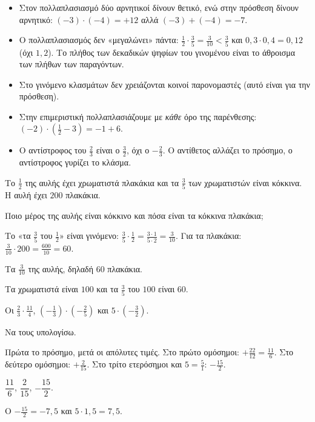 \begin{prosoxi}
\begin{itemize}[leftmargin=1.2em,itemsep=0.3ex,topsep=2pt]
\item Στον πολλαπλασιασμό δύο αρνητικοί δίνουν θετικό, ενώ στην πρόσθεση δίνουν αρνητικό: $(-3)\cdot(-4)=+12$ αλλά $(-3)+(-4)=-7$.
\item Ο πολλαπλασιασμός δεν «μεγαλώνει» πάντα: $\frac{1}{2}\cdot\frac{3}{5}=\frac{3}{10}<\frac{3}{5}$ και $0{,}3\cdot0{,}4=0{,}12$ (όχι $1{,}2$). Το πλήθος των δεκαδικών ψηφίων του γινομένου είναι το άθροισμα των πλήθων των παραγόντων.
\item Στο γινόμενο κλασμάτων δεν χρειάζονται κοινοί παρονομαστές (αυτό είναι για την πρόσθεση).
\item Στην επιμεριστική πολλαπλασιάζουμε με \emph{κάθε} όρο της παρένθεσης: $(-2)\cdot\left(\frac{1}{2}-3\right)=-1+6$.
\item Ο αντίστροφος του $\frac{2}{3}$ είναι ο $\frac{3}{2}$, όχι ο $-\frac{2}{3}$. Ο αντίθετος αλλάζει το πρόσημο, ο αντίστροφος γυρίζει το κλάσμα.
\end{itemize}
\end{prosoxi}


\tixero Το $\frac{1}{2}$ της αυλής έχει χρωματιστά πλακάκια και τα $\frac{3}{5}$ των χρωματιστών είναι κόκκινα. Η αυλή έχει $200$ πλακάκια.\par
\tithelo Ποιο μέρος της αυλής είναι κόκκινο και πόσα είναι τα κόκκινα πλακάκια;\par
\possindeo Το «τα $\frac{3}{5}$ του $\frac{1}{2}$» είναι γινόμενο: $\frac{3}{5}\cdot\frac{1}{2}=\frac{3\cdot1}{5\cdot2}=\frac{3}{10}$. Για τα πλακάκια: $\frac{3}{10}\cdot200=\frac{600}{10}=60$.\par
\apantisi Τα $\frac{3}{10}$ της αυλής, δηλαδή $60$ πλακάκια.\par
\elegxos Τα χρωματιστά είναι $100$ και τα $\frac{3}{5}$ του $100$ είναι $60$.

\tixero Οι $\frac{2}{3}\cdot\frac{11}{4}$, $\left(-\frac{1}{3}\right)\cdot\left(-\frac{2}{5}\right)$ και $5\cdot\left(-\frac{3}{2}\right)$.\par
\tithelo Να τους υπολογίσω.\par
\possindeo Πρώτα το πρόσημο, μετά οι απόλυτες τιμές. Στο πρώτο ομόσημοι: $+\frac{22}{12}=\frac{11}{6}$. Στο δεύτερο ομόσημοι: $+\frac{2}{15}$. Στο τρίτο ετερόσημοι και $5=\frac{5}{1}$: $-\frac{15}{2}$.\par
\apantisi $\dfrac{11}{6}$, $\dfrac{2}{15}$, $-\dfrac{15}{2}$.\par
\elegxos Ο $-\frac{15}{2}=-7{,}5$ και $5\cdot1{,}5=7{,}5$.

